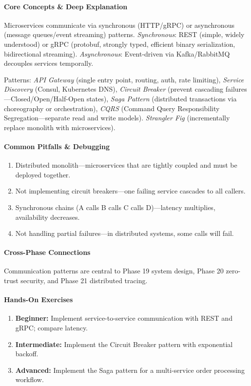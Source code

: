\documentclass[11pt, a4paper, oneside]{report}
\begin{document}
\paragraph{Core Concepts \& Deep Explanation} Microservices communicate via synchronous (HTTP/gRPC) or asynchronous (message queues/event streaming) patterns. \emph{Synchronous}: REST (simple, widely understood) or gRPC (protobuf, strongly typed, efficient binary serialization, bidirectional streaming). \emph{Asynchronous}: Event-driven via Kafka/RabbitMQ decouples services temporally.

Patterns: \emph{API Gateway} (single entry point, routing, auth, rate limiting), \emph{Service Discovery} (Consul, Kubernetes DNS), \emph{Circuit Breaker} (prevent cascading failures---Closed/Open/Half-Open states), \emph{Saga Pattern} (distributed transactions via choreography or orchestration), \emph{CQRS} (Command Query Responsibility Segregation---separate read and write models). \emph{Strangler Fig} (incrementally replace monolith with microservices).

\paragraph{Common Pitfalls \& Debugging}
\begin{enumerate}[leftmargin=*]
\item Distributed monolith---microservices that are tightly coupled and must be deployed together.
\item Not implementing circuit breakers---one failing service cascades to all callers.
\item Synchronous chains (A calls B calls C calls D)---latency multiplies, availability decreases.
\item Not handling partial failures---in distributed systems, some calls will fail.
\end{enumerate}

\paragraph{Cross-Phase Connections} Communication patterns are central to Phase 19 system design, Phase 20 zero-trust security, and Phase 21 distributed tracing.

\paragraph{Hands-On Exercises}
\begin{enumerate}[leftmargin=*]
\item \textbf{Beginner:} Implement service-to-service communication with REST and gRPC; compare latency.
\item \textbf{Intermediate:} Implement the Circuit Breaker pattern with exponential backoff.
\item \textbf{Advanced:} Implement the Saga pattern for a multi-service order processing workflow.
\end{enumerate}
\end{document}
